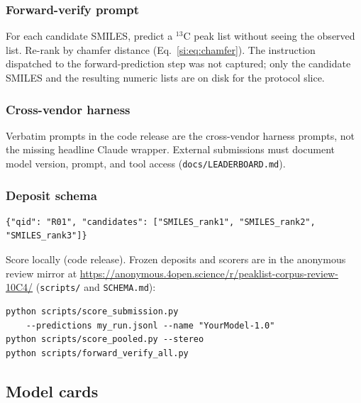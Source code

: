 \subsubsection{Forward-verify prompt}

For each candidate SMILES, predict a $^{13}$C peak list without seeing
the observed list.
Re-rank by chamfer distance (Eq.~\ref{si:eq:chamfer}).
The instruction dispatched to the forward-prediction step was
not captured; only the candidate SMILES and the resulting
numeric lists are on disk for the protocol slice.

\subsubsection{Cross-vendor harness}

Verbatim prompts in the code release are the cross-vendor
harness prompts, not the missing headline Claude wrapper.
External submissions must document model version, prompt, and tool access
(\texttt{docs/LEADERBOARD.md}).

\subsubsection{Deposit schema}

\begin{lstlisting}[style=irexpjson]
{"qid": "R01", "candidates": ["SMILES_rank1", "SMILES_rank2", "SMILES_rank3"]}
\end{lstlisting}

Score locally (code release).
Frozen deposits and scorers are in the anonymous review mirror at
\url{https://anonymous.4open.science/r/peaklist-corpus-review-10C4/}
(\texttt{scripts/} and \texttt{SCHEMA.md}):
\begin{verbatim}
python scripts/score_submission.py
    --predictions my_run.jsonl --name "YourModel-1.0"
python scripts/score_pooled.py --stereo
python scripts/forward_verify_all.py
\end{verbatim}

\par
\ifdim\pagegoal<\maxdimen
  \ifdim\dimexpr\pagegoal-\pagetotal\relax<0.58\textheight
    \newpage
  \fi
\fi
\subsection{Model cards}
\label{si:card}

